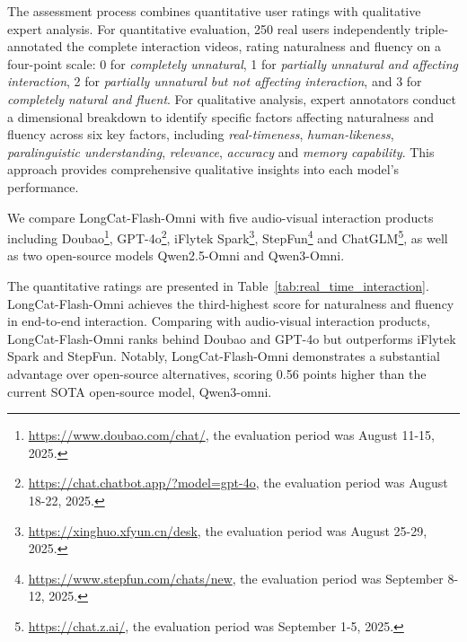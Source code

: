 \documentclass{article}
\begin{document}
The assessment process combines quantitative user ratings with qualitative expert analysis. 
For quantitative evaluation, 250 real users independently triple-annotated the complete interaction videos, rating naturalness and fluency on a four-point scale: 
0 for \textit{completely unnatural}, 
1 for \textit{partially unnatural and affecting interaction}, 
2 for \textit{partially unnatural but not affecting interaction}, 
and 3 for \textit{completely natural and fluent}.
For qualitative analysis, expert annotators conduct a dimensional breakdown to identify specific factors affecting naturalness and fluency across six key factors, including \textit{real-timeness}, \textit{human-likeness}, \textit{paralinguistic understanding}, \textit{relevance}, \textit{accuracy} and \textit{memory capability}.
This approach provides comprehensive qualitative insights into each model's performance.

We compare LongCat-Flash-Omni with five audio-visual interaction products including Doubao\footnote{\url{https://www.doubao.com/chat/}, the evaluation period was August 11-15, 2025.}, GPT-4o\footnote{\url{https://chat.chatbot.app/?model=gpt-4o}, the evaluation period was August 18-22, 2025.}, iFlytek Spark\footnote{\url{https://xinghuo.xfyun.cn/desk}, the evaluation period was August 25-29, 2025.}, StepFun\footnote{\url{https://www.stepfun.com/chats/new}, the evaluation period was September 8-12, 2025.} and ChatGLM\footnote{\url{https://chat.z.ai/}, the evaluation period was September 1-5, 2025.}, as well as two open-source models Qwen2.5-Omni and Qwen3-Omni.

The quantitative ratings are presented in Table~\ref{tab:real_time_interaction}. 
LongCat-Flash-Omni achieves the third-highest score for naturalness and fluency in end-to-end interaction. 
Comparing with audio-visual interaction products, LongCat-Flash-Omni ranks behind Doubao and GPT-4o but outperforms iFlytek Spark and StepFun. 
Notably, LongCat-Flash-Omni demonstrates a substantial advantage over open-source alternatives, scoring 0.56 points higher than the current SOTA open-source model, Qwen3-omni.
\end{document}
